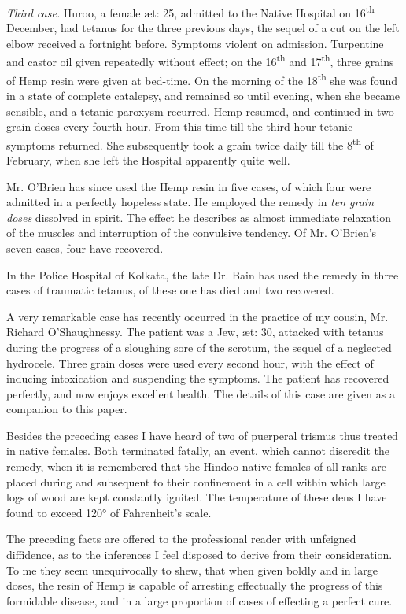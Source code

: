 \documentclass[a4paper, 11pt, oneside, polutonikogreek, english]{article}
\begin{document}
\emph{Third case.} Huroo, a female æt: 25, admitted to the Native Hospital on 16\textsuperscript{th} December, had tetanus for the three previous days, the sequel of a cut on the left elbow received a fortnight before. Symptoms violent on admission. Turpentine and castor oil given repeatedly without effect; on the 16\textsuperscript{th} and 17\textsuperscript{th}, three grains of Hemp resin were given at bed-time. On the morning of the 18\textsuperscript{th} she was found in a state of complete catalepsy, and remained so until evening, when she became sensible, and a tetanic paroxysm recurred. Hemp resumed, and continued in two grain doses every fourth hour. From this time till the third hour tetanic symptoms returned. She subsequently took a grain twice daily till the 8\textsuperscript{th} of February, when she left the Hospital apparently quite well.

Mr. O'Brien has since used the Hemp resin in five cases, of which four were admitted in a perfectly hopeless state. He employed the remedy in \emph{ten grain doses} dissolved in spirit. The effect he describes as almost immediate relaxation of the muscles and interruption of the convulsive tendency. Of Mr. O'Brien's seven cases, four have recovered.

In the Police Hospital of Kolkata, the late Dr. Bain has used the remedy in three cases of traumatic tetanus, of these one has died and two recovered.

A very remarkable case has recently occurred in the practice of my cousin, Mr. Richard O'Shaughnessy. The patient was a Jew, æt: 30, attacked with tetanus during the progress of a sloughing sore of the scrotum, the sequel of a neglected hydrocele. Three grain doses were used every second hour, with the effect of inducing intoxication and suspending the symptoms. The patient has recovered perfectly, and now enjoys excellent health. The details of this case are given as a companion to this paper.

Besides the preceding cases I have heard of two of puerperal trismus thus treated in native females. Both terminated fatally, an event, which cannot discredit the remedy, when it is remembered that the Hindoo native females of all ranks are placed during and subsequent to their confinement in a cell within which large logs of wood are kept constantly ignited. The temperature of these dens I have found to exceed 120° of Fahrenheit's scale.

The preceding facts are offered to the professional reader with unfeigned diffidence, as to the inferences I feel disposed to derive from their consideration. To me they seem unequivocally to shew, that when given boldly and in large doses, the resin of Hemp is capable of arresting effectually the progress of this formidable disease, and in a large proportion of cases of effecting a perfect cure.
\end{document}
